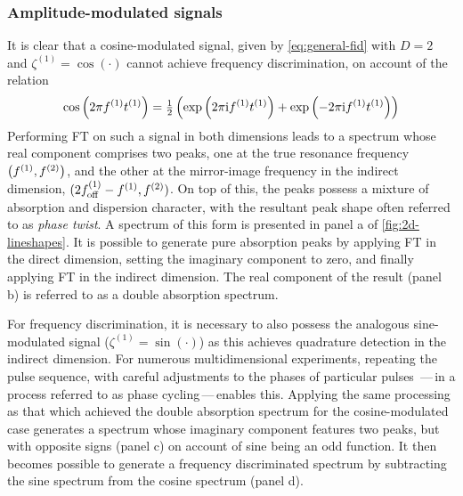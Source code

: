\subsubsection{Amplitude-modulated signals}
It is clear that a cosine-modulated signal, given by \cref{eq:general-fid}
with $D=2$ and $\zeta^{(1)} = \cos(\cdot)$ cannot achieve frequency
discrimination, on account of the relation
\begin{equation}
    \cos\left(2 \pi f^{(1)} t^{(1)}\right) =
    \tfrac{1}{2} \left(\exp\left(2 \pi \mathrm{i} f^{(1)} t^{(1)} \right) + \exp\left(-2 \pi \mathrm{i}
    f^{(1)} t^{(1)} \right)\right)
\end{equation}
Performing \ac{FT} on such a signal in both dimensions leads to a spectrum
whose real component comprises two peaks, one at the true resonance frequency
$\left(f^{(1)}, f^{(2)}\right)$, and the other at the mirror-image frequency in the
indirect dimension, $(2f_{\mathrm{off}}^{(1)} - f^{(1)}, f^{(2)})$. On top of this, the
peaks possess a mixture of absorption and dispersion character, with the
resultant peak shape often referred to as \emph{phase twist}\cite{Keeler1985}.
A spectrum of this form is presented in panel a of \cref{fig:2d-lineshapes}.
It is possible to generate pure absorption peaks by applying \ac{FT} in the
direct dimension, setting the imaginary component to zero, and finally
applying \ac{FT} in the indirect dimension. The real component of the result
(panel b) is referred to as a double absorption spectrum.

For frequency discrimination, it is necessary to also possess the
analogous sine-modulated signal ($\zeta^{(1)} = \sin(\cdot)$) as this
achieves quadrature detection in the indirect dimension. For
numerous multidimensional experiments, repeating the
pulse sequence, with careful adjustments to the phases of particular pulses
\,---\,in a process referred to as phase cycling\,---\,enables
this\cite[Chapter 11]{Keeler2010}.
Applying the same processing as that which achieved the double absorption
spectrum for the cosine-modulated case generates a spectrum whose imaginary
component features two peaks, but with opposite signs (panel c) on account of
sine being an odd function.
It then becomes possible to generate a frequency discriminated spectrum by
subtracting the sine spectrum from the cosine spectrum (panel d).

